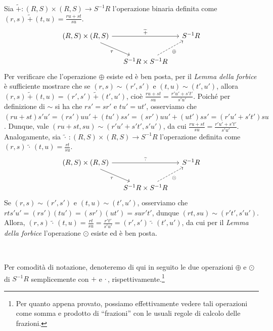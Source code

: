 \documentclass{article}
\theoremstyle{definition}
\begin{document}
\noindent Sia $\widetilde{+}\colon (R,S)\times (R,S)\to S^{-1}R$ l'operazione binaria definita come $(r,s)\,\widetilde{+}\,(t,u)=\frac{ru+st}{su}$.
\[
	\begin{tikzcd}[column sep=small]
{(R,S)\times(R,S)} \arrow[rd, "\tau"'] \arrow[rr, "\widetilde{+}"] &                                                     & S^{-1}R \\
                                                                   & S^{-1}R\times S^{-1}R \arrow[ru, "\oplus"', dashed] &        
\end{tikzcd}
\]
Per verificare che l'operazione $\oplus$ esiste ed è ben posta, per il \emph{Lemma della forbice} è sufficiente mostrare che se $(r,s)\sim (r',s')$ e $(t,u)\sim (t',u')$, allora $(r,s)\,\widetilde{+}\,(t,u)=(r',s')\,\widetilde{+}\,(t',u')$, cioè $\frac{ru+st}{su}=\frac{r'u'+s't'}{s'u'}$. Poiché per definizione di $\sim$ si ha che $rs'=sr'$ e $tu'=ut'$, osserviamo che $(ru+st)s'u'=(rs')uu'+(tu')ss'=(sr')uu'+(ut')ss'=(r'u'+s't')su$. Dunque, vale $(ru+st,su)\sim (r'u'+s't',s'u')$, da cui $\frac{ru+st}{su}=\frac{r'u'+s't'}{s'u'}$. \clearpage
\noindent Analogamente, sia $\widetilde{\cdot}\,\colon (R,S)\times (R,S)\to S^{-1}R$ l'operazione definita come $(r,s)\,\widetilde{\cdot}\,(t,u)=\frac{rt}{su}$.
\[
	\begin{tikzcd}[column sep=small]
{(R,S)\times(R,S)} \arrow[rd, "\tau"'] \arrow[rr, "\widetilde{\cdot}"] &                                                    & S^{-1}R \\
                                                                       & S^{-1}R\times S^{-1}R \arrow[ru, "\odot"', dashed] &        
\end{tikzcd}
\]
Se $(r,s)\sim (r',s')$ e $(t,u)\sim (t',u')$, osserviamo che $rts'u'=(rs')(tu')=(sr')(ut')=sur't'$, dunque $(rt,su)\sim(r't',s'u')$. Allora, $(r,s)\,\widetilde{\cdot}\,(t,u)=\frac{rt}{su}=\frac{r't'}{s'u'}=(r',s')\,\widetilde{\cdot}\,(t',u')$, da cui per il \emph{Lemma della forbice} l'operazione $\odot$ esiste ed è ben posta.

\

\vspace{-2mm}

\noindent Per comodità di notazione, denoteremo di qui in seguito le due operazioni $\oplus$ e $\odot$ di $S^{-1}R$ semplicemente con $+$ e $\cdot$\,, rispettivamente.\footnote{Per quanto appena provato, possiamo effettivamente vedere tali operazioni come somma e prodotto di ``frazioni'' con le usuali regole di calcolo delle frazioni.}
\end{document}
